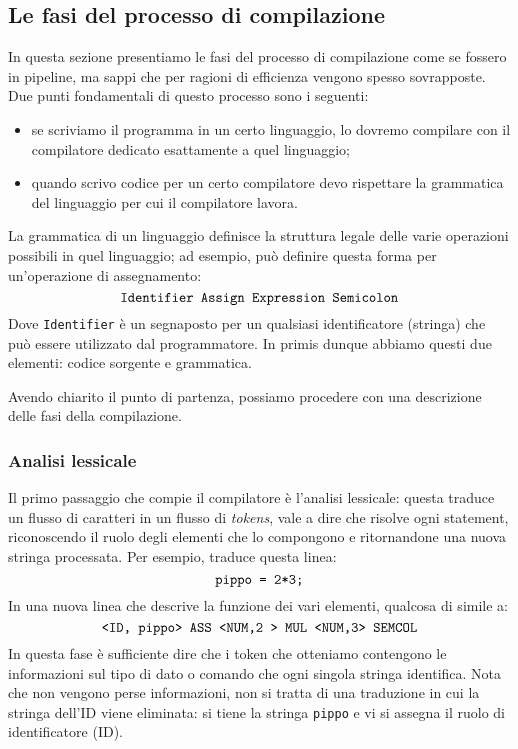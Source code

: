\documentclass[class=book, crop=false, oneside, 12pt]{standalone}
\begin{document}
\subsection{Le fasi del processo di compilazione}
In questa sezione presentiamo le fasi del processo di compilazione come se fossero in pipeline, ma sappi che per ragioni di efficienza vengono spesso sovrapposte. Due punti fondamentali di questo processo sono i seguenti:
\begin{itemize}
    \item se scriviamo il programma in un certo linguaggio, lo dovremo compilare con il compilatore dedicato esattamente a quel linguaggio;
    \item quando scrivo codice per un certo compilatore devo rispettare la grammatica del linguaggio per cui il compilatore lavora.
\end{itemize}
La grammatica di un linguaggio definisce la struttura legale delle varie operazioni possibili in quel linguaggio; ad esempio, può definire questa forma per un’operazione di assegnamento:
\begin{equation*}
	\textrm{\texttt{Identifier Assign Expression Semicolon}}
\end{equation*}
Dove \texttt{Identifier} è un segnaposto per un qualsiasi identificatore (stringa) che può essere utilizzato dal programmatore.
In primis dunque abbiamo questi due elementi: codice sorgente e grammatica.

Avendo chiarito il punto di partenza, possiamo procedere con una descrizione delle fasi della compilazione.

\subsubsection{Analisi lessicale}
Il primo passaggio che compie il compilatore è l’analisi lessicale: questa traduce un flusso di caratteri in un flusso di \emph{tokens}, vale a dire che risolve ogni statement, riconoscendo il ruolo degli elementi che lo compongono e ritornandone una nuova stringa processata. Per esempio, traduce questa linea:
\begin{equation*}
	\textrm{\texttt{pippo = 2*3;}}
\end{equation*}
In una nuova linea che descrive la funzione dei vari elementi, qualcosa di simile a:
\begin{equation*}
	\textrm{\texttt{<ID, pippo> ASS <NUM,2 > MUL <NUM,3> SEMCOL}}
\end{equation*}
In questa fase è sufficiente dire che i token che otteniamo contengono le informazioni sul tipo di dato o comando che ogni singola stringa identifica. Nota che non vengono perse informazioni, non si tratta di una traduzione in cui la stringa dell’ID viene eliminata: si tiene la stringa \texttt{pippo} e vi si assegna il ruolo di identificatore (ID).
\end{document}
